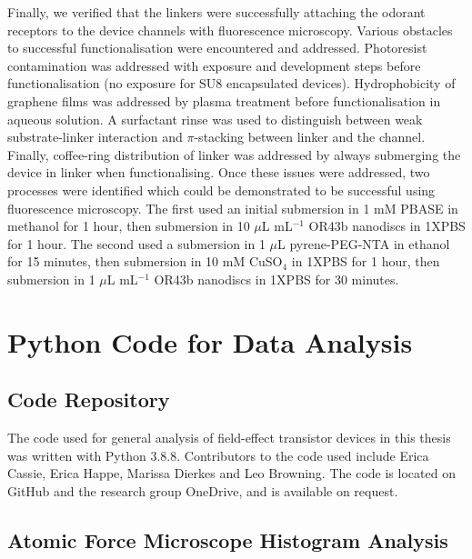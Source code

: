 \documentclass[
  a4paper,
]{scrbook}
\begin{document}
Finally, we verified that the linkers were successfully attaching the
odorant receptors to the device channels with fluorescence microscopy.
Various obstacles to successful functionalisation were encountered and
addressed. Photoresist contamination was addressed with exposure and
development steps before functionalisation (no exposure for SU8
encapsulated devices). Hydrophobicity of graphene films was addressed by
plasma treatment before functionalisation in aqueous solution. A
surfactant rinse was used to distinguish between weak substrate-linker
interaction and \(\pi\)-stacking between linker and the channel.
Finally, coffee-ring distribution of linker was addressed by always
submerging the device in linker when functionalising. Once these issues
were addressed, two processes were identified which could be
demonstrated to be successful using fluorescence microscopy. The first
used an initial submersion in 1 mM PBASE in methanol for 1 hour, then
submersion in 10 \(\mu\)L mL\(^{-1}\) OR43b nanodiscs in 1XPBS for 1
hour. The second used a submersion in 1 \(\mu\)L pyrene-PEG-NTA in
ethanol for 15 minutes, then submersion in 10 mM CuSO\(_4\) in 1XPBS for
1 hour, then submersion in 1 \(\mu\)L mL\(^{-1}\) OR43b nanodiscs in
1XPBS for 30 minutes.

\cleardoublepage
{}
{}
\appendix

\hypertarget{sec-python}{%
\chapter{Python Code for Data Analysis}\label{sec-python}}

\hypertarget{code-repository}{%
\section{Code Repository}\label{code-repository}}

The code used for general analysis of field-effect transistor devices in
this thesis was written with Python 3.8.8. Contributors to the code used
include Erica Cassie, Erica Happe, Marissa Dierkes and Leo Browning. The
code is located on GitHub and the research group OneDrive, and is
available on request.

\hypertarget{sec-histogram-analysis}{%
\section{Atomic Force Microscope Histogram
Analysis}\label{sec-histogram-analysis}}
\end{document}
